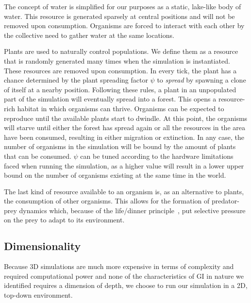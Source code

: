 The concept of water is simplified for our purposes as a static, lake-like body of water.
This resource is generated sparsely at central positions and will not be removed upon consumption.
Organisms are forced to interact with each other by the collective need to gather water at the same locations.

Plants are used to naturally control populations. We define them as a resource that is randomly generated
many times when the simulation is instantiated. These resources are removed upon consumption. In every tick, 
the plant has a chance determined by the plant spreading factor \(\psi \) to \emph{spread} by spawning a clone of itself
at a nearby position. Following these rules, a plant in an unpopulated part of the simulation will eventually spread 
into a forest.
This opens a resource-rich habitat in which organisms can thrive. Organisms can be expected to 
reproduce until the available plants start to dwindle. At this point, the organisms will starve until either 
the forest has spread again or all the resources in the area have been consumed, resulting in either
migration or extinction. In any case, the number of organisms in the simulation will be bound by the amount of 
plants that can be consumed. 
\(\psi \) can be tuned according to the hardware limitations faced when running the simulation, as a higher value
will result in a lower upper bound on the number of organisms existing at the same time in the world.

The last kind of resource available to an organism is, as an alternative to plants, the consumption of 
other organisms. This allows for the formation of predator-prey dynamics which, 
because of the life/dinner principle~\cite{Dawkins1982}, put selective pressure on the prey to adapt to its 
environment.

\subsection{Dimensionality}
Because 3D simulations are much more expensive in terms of complexity and required computational power and
none of the characteristics of GI in nature we identified requires a dimension of depth, we choose
to run our simulation in a 2D, top-down environment.
